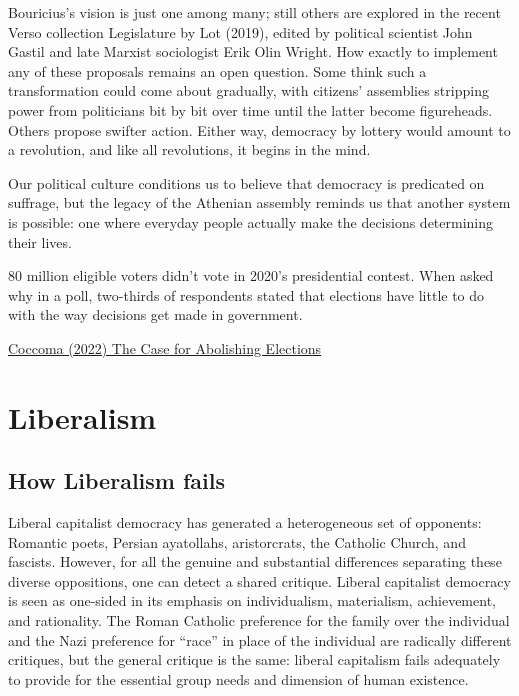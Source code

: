 \documentclass[
]{book}
\begin{document}
Bouricius's vision is just one among many; still others are explored in the recent Verso collection Legislature by Lot (2019), edited by political scientist John Gastil and late Marxist sociologist Erik Olin Wright.
How exactly to implement any of these proposals remains an open question. Some think such a transformation could come about gradually, with citizens' assemblies stripping power from politicians bit by bit over time until the latter become figureheads. Others propose swifter action. Either way, democracy by lottery would amount to a revolution, and like all revolutions, it begins in the mind.

Our political culture conditions us to believe that democracy is predicated on suffrage, but the legacy of the Athenian assembly reminds us that another system is possible: one where everyday people actually make the decisions determining their lives.

80 million eligible voters didn't vote in 2020's presidential contest. When asked why in a poll, two-thirds of respondents stated that elections have little to do with the way decisions get made in government.

\href{https://www.bostonreview.net/articles/the-case-for-abolishing-elections/}{Coccoma (2022) The Case for Abolishing Elections}

\hypertarget{liberalism}{%
\chapter{Liberalism}\label{liberalism}}

\hypertarget{how-liberalism-fails}{%
\section{How Liberalism fails}\label{how-liberalism-fails}}

Liberal capitalist democracy has generated a heterogeneous set of opponents: Romantic poets, Persian ayatollahs, aristorcrats, the Catholic Church, and fascists. However, for all the genuine and substantial differences separating these diverse oppositions, one can detect a shared critique. Liberal capitalist democracy is seen as one-sided in its emphasis on individualism, materialism, achievement, and rationality. The Roman Catholic preference for the family over the individual and the Nazi preference for ``race'' in place of the individual are radically different critiques, but the general critique is the same: liberal capitalism fails adequately to provide for the essential group needs and dimension of human existence.
\end{document}
